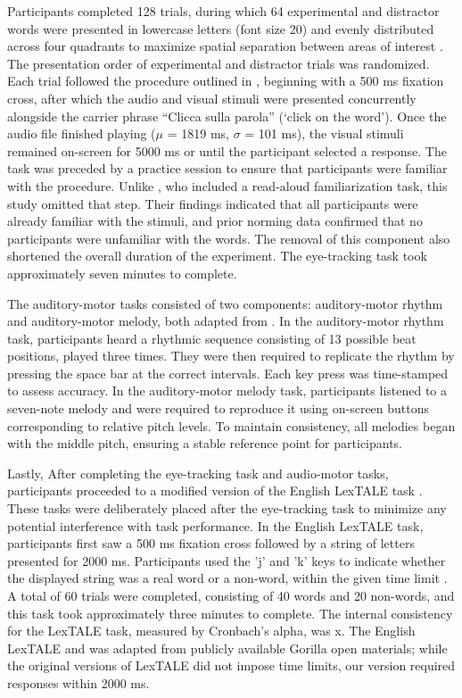 Participants completed 128 trials, during which 64 experimental and distractor words were presented in lowercase letters (font size 20) and evenly distributed across four quadrants to maximize spatial separation between areas of interest \citep{bramlett_wiener_24-AOW}. The presentation order of experimental and distractor trials was randomized. Each trial followed the procedure outlined in \cite{Ge_et_al}, beginning with a 500 ms fixation cross, after which the audio and visual stimuli were presented concurrently alongside the carrier phrase “Clicca sulla parola” (‘click on the word’). Once the audio file finished playing ($\mu$ = 1819 ms, $\sigma$ = 101 ms), the visual stimuli remained on-screen for 5000 ms or until the participant selected a response. The task was preceded by a practice session to ensure that participants were familiar with the procedure. Unlike \cite{Ge_et_al}, who included a read-aloud familiarization task, this study omitted that step. Their findings indicated that all participants were already familiar with the stimuli, and prior norming data confirmed that no participants were unfamiliar with the words. The removal of this component also shortened the overall duration of the experiment. The eye-tracking task took approximately seven minutes to complete.

The auditory-motor tasks consisted of two components: auditory-motor rhythm and auditory-motor melody, both adapted from \citep{Kachlicka_Saito_Tierney_2019}. In the auditory-motor rhythm task, participants heard a rhythmic sequence consisting of 13 possible beat positions, played three times. They were then required to replicate the rhythm by pressing the space bar at the correct intervals. Each key press was time-stamped to assess accuracy. In the auditory-motor melody task, participants listened to a seven-note melody and were required to reproduce it using on-screen buttons corresponding to relative pitch levels. To maintain consistency, all melodies began with the middle pitch, ensuring a stable reference point for participants.

Lastly, After completing the eye-tracking task and audio-motor tasks, participants proceeded to a modified version of the English LexTALE task \citep{lemhofer2012introducing}. These tasks were deliberately placed after the eye-tracking task to minimize any potential interference with task performance. In the English LexTALE task, participants first saw a 500 ms fixation cross followed by a string of letters presented for 2000 ms. Participants used the 'j' and 'k' keys to indicate whether the displayed string was a real word or a non-word, within the given time limit \citep{lemhofer2012introducing}. A total of 60 trials were completed, consisting of 40 words and 20 non-words, and this task took approximately three minutes to complete. The internal consistency for the LexTALE task, measured by Cronbach’s alpha, was x. The English LexTALE and was adapted from publicly available Gorilla open materials; while the original versions of LexTALE did not impose time limits, our version required responses within 2000 ms.

